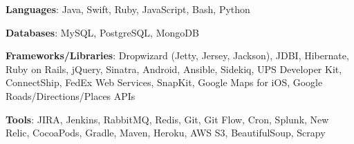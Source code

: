 
	

\begin{cventries}
\vspace{-5mm}
  \cventry
    {}
    {}
    {}
    {}
    {
      \begin{cvitems}
        \item {\textbf{Languages}: Java, Swift, Ruby, JavaScript, Bash, Python}
        \item {\textbf{Databases}: MySQL, PostgreSQL, MongoDB}
        \item {\textbf{Frameworks/Libraries}: Dropwizard (Jetty, Jersey, Jackson), JDBI, Hibernate, Ruby on Rails, jQuery, Sinatra, Android, Ansible, Sidekiq, UPS Developer Kit, ConnectShip, FedEx Web Services, SnapKit, Google Maps for iOS, Google Roads/Directions/Places APIs}
        \item {\textbf{Tools}: JIRA, Jenkins, RabbitMQ, Redis, Git, Git Flow, Cron, Splunk, New Relic, CocoaPods, Gradle, Maven, Heroku, AWS S3, BeautifulSoup, Scrapy}
      \end{cvitems}
    }
\end{cventries}